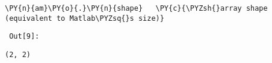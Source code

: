 {\par%
\vspace{-1\baselineskip}%
}%
\begin{notebookcell}[9]%
\begin{addmargin}[\cellleftmargin]{0em}%
{\smaller%
\par%
%
\vspace{-1\smallerfontscale}%
\begin{Verbatim}[commandchars=\\\{\}]
\PY{n}{am}\PY{o}{.}\PY{n}{shape}   \PY{c}{\PYZsh{}array shape (equivalent to Matlab\PYZsq{}s size)}
\end{Verbatim}
%
\par%
\vspace{-1\smallerfontscale}}%
\end{addmargin}
\end{notebookcell}

\par\vspace{1\smallerfontscale}%
    
        {\par%
        \vspace{-1\smallerfontscale}%
        \noindent%
        \begin{minipage}{\cellleftmargin}%
    \hfill%
    {\smaller%
    \tt%
    \color{nbframe-out-prompt}%
    Out[9]:}%
    \hspace{\inputpadding}%
    \hspace{0em}%
    \hspace{3pt}%
    \end{minipage}%
        }%
    \begin{addmargin}[\cellleftmargin]{0em}%
    {\smaller%
    \vspace{-1\smallerfontscale}%
    
    
    
    \begin{verbatim}
(2, 2)
    \end{verbatim}

    
}%
    \end{addmargin}%

